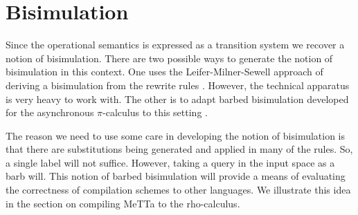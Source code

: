 \section{Bisimulation}
Since the operational semantics is expressed as a transition system we recover a notion of bisimulation. There are two possible ways to generate the notion of bisimulation in this context. One uses the Leifer-Milner-Sewell approach of deriving a bisimulation from the rewrite rules \cite{DBLP:conf/concur/LeiferM00}. However, the technical apparatus is very heavy to work with. The other is to adapt barbed bisimulation developed for the asynchronous $\pi$-calculus to this setting \cite{DBLP:books/daglib/0004377}.

The reason we need to use some care in developing the notion of bisimulation is that there are substitutions being generated and applied in many of the rules. So, a single label will not suffice. However, taking a query in the input space as a barb will. This notion of barbed bisimulation will provide a means of evaluating the correctness of compilation schemes to other languages. We illustrate this idea in the section on compiling MeTTa to the rho-calculus.

